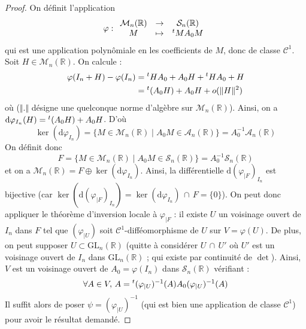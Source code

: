 	\begin{proof}
		On définit l'application
		\[ \varphi :
		\begin{array}{ccc}
			\mathcal{M}_n(\mathbb{R}) &\rightarrow& \mathcal{S}_n(\mathbb{R}) \\
			M &\mapsto& \mathstrut ^t M A_0 M
		\end{array}
		\]
		qui est une application polynômiale en les coefficients de $M$, donc de classe $\mathcal{C}^1$. Soit $H \in \mathcal{M}_n(\mathbb{R})$. On calcule :
		\begin{align*}
			\varphi(I_n + H) - \varphi(I_n) &= \mathstrut ^t H A_0 + A_0 H + \mathstrut ^t H A_0 + H \\
			&= \mathstrut ^t (A_0 H) + A_0 H + o(\Vert H \Vert^2)
		\end{align*}
		où ($\Vert . \Vert$ désigne une quelconque norme d'algèbre sur $\mathcal{M}_n(\mathbb{R})$). Ainsi, on a $\mathrm{d} \varphi_{I_n}(H) = \mathstrut ^t (A_0 H) + A_0 H$. D'où
		\[ \ker(\mathrm{d} \varphi_{I_n}) = \{ M \in \mathcal{M}_n(\mathbb{R}) \mid A_0 M \in \mathcal{A}_n(\mathbb{R}) \} = A_0^{-1} \mathcal{A}_n(\mathbb{R}) \]
		On définit donc
		\[ F = \{ M \in \mathcal{M}_n(\mathbb{R}) \mid A_0 M \in \mathcal{S}_n(\mathbb{R}) \} = A_0^{-1} \mathcal{S}_n(\mathbb{R})  \]
		et on a $\mathcal{M}_n(\mathbb{R}) = F \oplus \ker(\mathrm{d} \varphi_{I_n})$. Ainsi, la différentielle $\mathrm{d} (\varphi_{|F})_{I_n}$ est bijective (car $\ker(\mathrm{d} (\varphi_{|F})_{I_n}) = \ker(\mathrm{d} \varphi_{I_n}) \, \cap \, F = \{ 0 \}$).
		\newpar
		On peut donc appliquer le théorème d'inversion locale à $\varphi_{|F}$ : il existe $U$ un voisinage ouvert de $I_n$ dans $F$ tel que $(\varphi_{|U})$ soit $\mathcal{C}^1$-difféomorphisme de $U$ sur $V = \varphi(U)$. De plus, on peut supposer $U \subset \mathrm{GL}_n(\mathbb{R})$ (quitte à considérer $U \, \cap \, U'$ où $U'$ est un voisinage ouvert de $I_n$ dans $\mathrm{GL}_n(\mathbb{R})$ ; qui existe par continuité de $\det$).
		\newpar
		Ainsi, $V$ est un voisinage ouvert de $A_0 = \varphi(I_n)$ dans $\mathcal{S}_n(\mathbb{R})$ vérifiant :
		\[ \forall A \in V, \, A = \mathstrut ^t (\varphi_{|U})^{-1}(A) A_0 (\varphi_{|U})^{-1}(A) \]
		Il suffit alors de poser $\psi = (\varphi_{|U})^{-1}$ (qui est bien une application de classe $\mathcal{C}^1$) pour avoir le résultat demandé.
	\end{proof}


